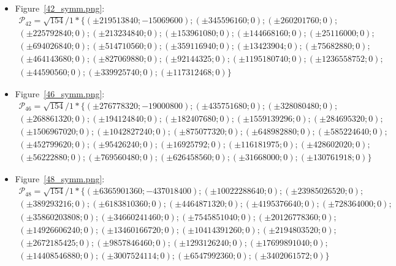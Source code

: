 \documentclass[12pt]{article}
\theoremstyle{theorem}
\theoremstyle{dfn}
\theoremstyle{remark}
\begin{document}
\begin{itemize}
\setlength{\itemsep}{-1mm}


\item
Figure~\ref{42_symm.png}:
\begin{multline}
	\mathcal{P}_{42}=\sqrt{154}/{1} * \{
		(\pm219513840; -15069600);
		(\pm 345596160; 0);
		(\pm260201760; 0);
		\\
		(\pm225792840; 0);
		(\pm213234840; 0);
		(\pm153961080; 0);
		(\pm144668160; 0);
		(\pm25116000; 0);
		\\
		(\pm694026840; 0);
		(\pm514710560; 0);
		(\pm359116940; 0);
		(\pm13423904; 0);
		(\pm75682880; 0);
		\\
		(\pm464143680; 0);
		(\pm827069880; 0);
		(\pm92144325; 0);
		(\pm1195180740; 0);
		(\pm1236558752; 0);
		\\
		(\pm44590560; 0);
		(\pm339925740; 0);
		(\pm117312468; 0)
	\}
\end{multline}

\item
Figure~\ref{46_symm.png}:
\begin{multline}
	\mathcal{P}_{46}=
	\sqrt{154}/{1} * \{
		(\pm276778320; -19000800);
		(\pm435751680; 0);
		(\pm328080480; 0);
		\\
		(\pm268861320; 0);
		(\pm194124840; 0);
		(\pm182407680; 0);
		(\pm1559139296; 0);
		(\pm284695320; 0);
		\\
		(\pm1506967020; 0);
		(\pm1042827240; 0);
		(\pm875077320; 0);
		(\pm648982880; 0);
		(\pm585224640; 0);
		\\
		(\pm452799620; 0);
		(\pm95426240; 0);
		(\pm16925792; 0);
		(\pm116181975; 0);
		(\pm428602020; 0);
		\\
		(\pm56222880; 0);
		(\pm769560480; 0);
		(\pm626458560; 0);
		(\pm31668000; 0);
		(\pm130761918; 0)
	\}
\end{multline}

\item
Figure~\ref{48_symm.png}:
\begin{multline}
	\mathcal{P}_{48}=
	\sqrt{154}/{1} * \{
		( \pm6365901360 ; -437018400);
		( \pm10022288640; 0);
		( \pm23985026520 ; 0);
		\\
		( \pm389293216 ; 0);
		( \pm6183810360 ; 0);
		( \pm4464871320 ; 0);
		( \pm4195376640 ; 0);
		( \pm728364000 ; 0);
		\\
		( \pm35860203808 ; 0);
		( \pm34660241460 ; 0);
		( \pm7545851040 ; 0);
		( \pm20126778360 ; 0);
		\\
		( \pm14926606240 ; 0);
		( \pm13460166720 ; 0);
		( \pm10414391260 ; 0);
		( \pm2194803520 ; 0);
		\\
		( \pm2672185425 ; 0);
		( \pm9857846460 ; 0);
		( \pm1293126240 ; 0);
		( \pm17699891040 ; 0);
		\\
		( \pm14408546880 ; 0);
		( \pm3007524114 ; 0);
		( \pm6547992360 ; 0);
		( \pm3402061572 ; 0)
	\}
\end{multline}

\end{itemize}
\end{document}
